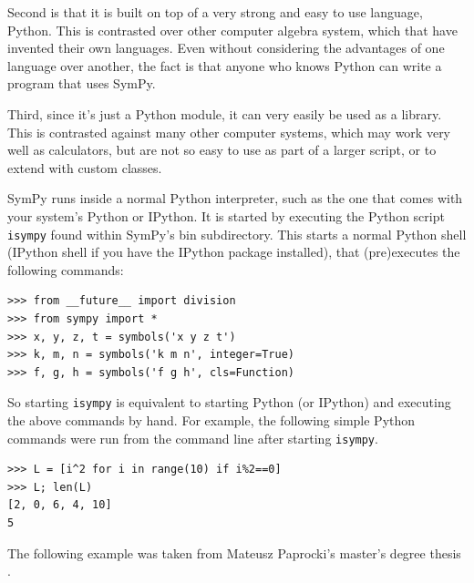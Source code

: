 \documentclass[12pt]{article}
\begin{document}
Second is that it is built on top of a very strong and easy to use
language, Python.  This is contrasted over other
computer algebra system, which that have invented their
own languages.  Even without considering the advantages of one language
over another, the fact is that anyone who knows Python can write a program
that uses SymPy.

Third, since it's just a Python module, it can very
easily be used as a library.  This is contrasted against many
other computer systems, which may work very well as calculators, but are not
so easy to use as part of a larger script, or to extend with custom classes.

SymPy runs inside a normal Python interpreter, such as the one that
comes with your system's Python or IPython.
It is started by executing the Python script {\tt isympy}
found within SymPy's bin subdirectory.
This starts a normal Python shell (IPython shell if you have the
IPython package installed),  that (pre)executes the following commands:

\begin{Verbatim}[fontsize=\scriptsize,fontfamily=courier,fontshape=tt,frame=single,label=Python]
>>> from __future__ import division
>>> from sympy import *
>>> x, y, z, t = symbols('x y z t')
>>> k, m, n = symbols('k m n', integer=True)
>>> f, g, h = symbols('f g h', cls=Function)
\end{Verbatim}
So starting {\tt isympy} is equivalent to starting Python (or IPython)
and executing the above commands by hand.
For example, the following simple Python commands were run
from the command line after starting {\tt isympy}.

\begin{Verbatim}[fontsize=\scriptsize,fontfamily=courier,fontshape=tt,frame=single,label=SymPy]
>>> L = [i^2 for i in range(10) if i%2==0]
>>> L; len(L)
[2, 0, 6, 4, 10]
5
\end{Verbatim}

The following example was taken from Mateusz Paprocki's master's
degree thesis \cite{P}.
\end{document}
